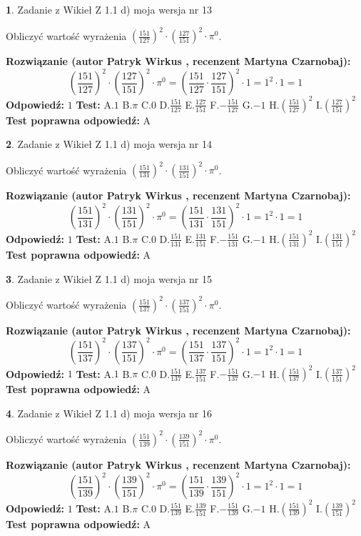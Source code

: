 \documentclass[12pt, a4paper]{article}
\theoremstyle{definition} %
\newtheorem{zad}{}
\newcommand{\zadStart}[1]{\begin{zad}#1\newline}
\newcommand{\zadStop}{\end{zad}}
\newcommand{\rozwStart}[2]{\noindent \textbf{Rozwiązanie (autor #1 , recenzent #2): }\newline}
\newcommand{\rozwStop}{\newline}
\newcommand{\odpStart}{\noindent \textbf{Odpowiedź:}\newline}
\newcommand{\odpStop}{\newline}
\newcommand{\testStart}{\noindent \textbf{Test:}\newline}
\newcommand{\testStop}{\newline}
\newcommand{\kluczStart}{\noindent \textbf{Test poprawna odpowiedź:}\newline}
\newcommand{\kluczStop}{\newline}
\begin{document}
\zadStart{Zadanie z Wikieł Z 1.1 d) moja wersja nr 13}

Obliczyć wartość wyrażenia $(\frac{151}{127})^{2} \cdot (\frac{127}{151})^{2} \cdot \pi^{0}$.
\zadStop
\rozwStart{Patryk Wirkus}{Martyna Czarnobaj}
$$(\frac{151}{127})^{2} \cdot (\frac{127}{151})^{2} \cdot \pi^{0} = (\frac{151}{127} \cdot \frac{127}{151})^{2} \cdot 1 = 1^{2} \cdot 1 = 1$$
\rozwStop
\odpStart
$1$
\odpStop
\testStart
A.$1$ B.$\pi$ C.$0$ D.$\frac{151}{127}$ E.$\frac{127}{151}$
F.$-\frac{151}{127}$ G.$-1$
H.$(\frac{151}{127})^{2}$
I.$(\frac{127}{151})^{2}$
\testStop
\kluczStart
A
\kluczStop



\zadStart{Zadanie z Wikieł Z 1.1 d) moja wersja nr 14}

Obliczyć wartość wyrażenia $(\frac{151}{131})^{2} \cdot (\frac{131}{151})^{2} \cdot \pi^{0}$.
\zadStop
\rozwStart{Patryk Wirkus}{Martyna Czarnobaj}
$$(\frac{151}{131})^{2} \cdot (\frac{131}{151})^{2} \cdot \pi^{0} = (\frac{151}{131} \cdot \frac{131}{151})^{2} \cdot 1 = 1^{2} \cdot 1 = 1$$
\rozwStop
\odpStart
$1$
\odpStop
\testStart
A.$1$ B.$\pi$ C.$0$ D.$\frac{151}{131}$ E.$\frac{131}{151}$
F.$-\frac{151}{131}$ G.$-1$
H.$(\frac{151}{131})^{2}$
I.$(\frac{131}{151})^{2}$
\testStop
\kluczStart
A
\kluczStop



\zadStart{Zadanie z Wikieł Z 1.1 d) moja wersja nr 15}

Obliczyć wartość wyrażenia $(\frac{151}{137})^{2} \cdot (\frac{137}{151})^{2} \cdot \pi^{0}$.
\zadStop
\rozwStart{Patryk Wirkus}{Martyna Czarnobaj}
$$(\frac{151}{137})^{2} \cdot (\frac{137}{151})^{2} \cdot \pi^{0} = (\frac{151}{137} \cdot \frac{137}{151})^{2} \cdot 1 = 1^{2} \cdot 1 = 1$$
\rozwStop
\odpStart
$1$
\odpStop
\testStart
A.$1$ B.$\pi$ C.$0$ D.$\frac{151}{137}$ E.$\frac{137}{151}$
F.$-\frac{151}{137}$ G.$-1$
H.$(\frac{151}{137})^{2}$
I.$(\frac{137}{151})^{2}$
\testStop
\kluczStart
A
\kluczStop



\zadStart{Zadanie z Wikieł Z 1.1 d) moja wersja nr 16}

Obliczyć wartość wyrażenia $(\frac{151}{139})^{2} \cdot (\frac{139}{151})^{2} \cdot \pi^{0}$.
\zadStop
\rozwStart{Patryk Wirkus}{Martyna Czarnobaj}
$$(\frac{151}{139})^{2} \cdot (\frac{139}{151})^{2} \cdot \pi^{0} = (\frac{151}{139} \cdot \frac{139}{151})^{2} \cdot 1 = 1^{2} \cdot 1 = 1$$
\rozwStop
\odpStart
$1$
\odpStop
\testStart
A.$1$ B.$\pi$ C.$0$ D.$\frac{151}{139}$ E.$\frac{139}{151}$
F.$-\frac{151}{139}$ G.$-1$
H.$(\frac{151}{139})^{2}$
I.$(\frac{139}{151})^{2}$
\testStop
\kluczStart
A
\kluczStop
\end{document}
